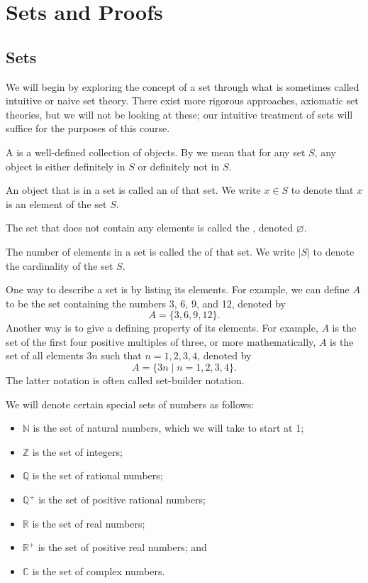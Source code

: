\chapter{Sets and Proofs}

\section{Sets}

We will begin by exploring the concept of a set through what is sometimes called intuitive or naive set theory. There exist more rigorous approaches, axiomatic set theories, but we will not be looking at these; our intuitive treatment of sets will suffice for the purposes of this course.

\begin{defn}
A  is a well-defined collection of objects. By  we mean that for any set $ S $, any object is either definitely in $ S $ or definitely not in $ S $.

An object that is in a set is called an  of that set. We write $ x\in S $ to denote that $ x $ is an element of the set $ S $.

The set that does not contain any elements is called the , denoted $ \varnothing $.

The number of elements in a set is called the  of that set. We write $ \lvert S\rvert $ to denote the cardinality of the set $ S $.
\end{defn}

One way to describe a set is by listing its elements. For example, we can define $ A $ to be the set containing the numbers 3, 6, 9, and 12, denoted by
\begin{equation*}
    A=\{3,6,9,12\}.
\end{equation*}
Another way is to give a defining property of its elements. For example, $ A $ is the set of the first four positive multiples of three, or more mathematically, $ A $ is the set of all elements $ 3n $ such that $ n=1,2,3,4 $, denoted by
\begin{equation*}
    A=\{3n\mid n=1,2,3,4\}.
\end{equation*}
The latter notation is often called set-builder notation.

We will denote certain special sets of numbers as follows:
\begin{itemize}
    \item $ \mathbb{N} $ is the set of natural numbers, which we will take to start at 1;
    \item $ \mathbb{Z} $ is the set of integers;
    \item $ \mathbb{Q} $ is the set of rational numbers;
    \item $ \mathbb{Q}^+ $ is the set of positive rational numbers;
    \item $ \mathbb{R} $ is the set of real numbers;
    \item $ \mathbb{R}^+ $ is the set of positive real numbers; and
    \item $ \mathbb{C} $ is the set of complex numbers.
\end{itemize}

